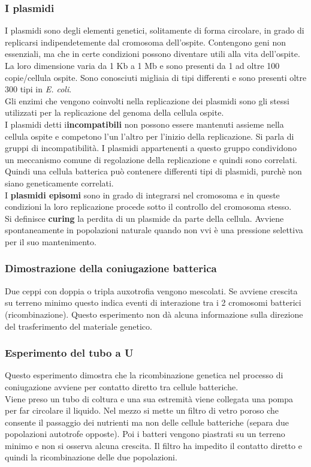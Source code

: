 \subsubsection{I plasmidi}
I plasmidi sono degli elementi genetici, solitamente di forma circolare, in grado di replicarsi indipendetemente dal cromosoma dell'ospite. Contengono geni non essenziali, ma che in certe condizioni possono diventare utili alla vita dell'ospite. 
\\La loro dimensione varia da 1 Kb a 1 Mb e sono presenti da 1 ad oltre 100 copie/cellula ospite. Sono conosciuti migliaia di tipi differenti e sono presenti oltre 300 tipi in \textit{E. coli}. 
\\Gli enzimi che vengono coinvolti nella replicazione dei plasmidi sono gli stessi utilizzati per la replicazione del genoma della cellula ospite. \\I plasmidi detti i\textbf{incompatibili} non possono essere mantenuti assieme nella cellula ospite e competono l'un l'altro per l'inizio della replicazione. Si parla di gruppi di incompatibilità. I plasmidi appartenenti a questo gruppo condividono un meccanismo comune di regolazione della replicazione e quindi sono correlati. Quindi una cellula batterica può contenere differenti tipi di plasmidi, purchè non siano geneticamente correlati. 
\\I \textbf{plasmidi episomi} sono in grado di integrarsi nel cromosoma e in queste condizioni la loro replicazione procede sotto il controllo del cromosoma stesso.
\\Si definisce \textbf{curing} la perdita di un plasmide da parte della cellula. Avviene spontaneamente in popolazioni naturale quando non vvi è una pressione selettiva per il suo mantenimento.
\subsubsection{Dimostrazione della coniugazione batterica}
Due ceppi con doppia o tripla auxotrofia vengono mescolati. Se avviene crescita su terreno minimo questo indica eventi di interazione tra i 2 cromosomi batterici (ricombinazione). Questo esperimento non dà alcuna informazione sulla direzione del trasferimento del materiale genetico.
\subsubsection{Esperimento del tubo a U}
Questo esperimento dimostra che la ricombinazione genetica nel processo di coniugazione avviene per contatto diretto tra cellule batteriche. 
\\Viene preso un tubo di coltura e una sua estremità viene collegata una pompa per far circolare il liquido. Nel mezzo si mette un filtro di vetro poroso che consente il passaggio dei nutrienti ma non delle cellule batteriche (separa due popolazioni autotrofe opposte). Poi i batteri vengono piastrati su un terreno minimo e non si osserva alcuna crescita. Il filtro ha impedito il contatto diretto e quindi la ricombinazione delle due popolazioni. 
